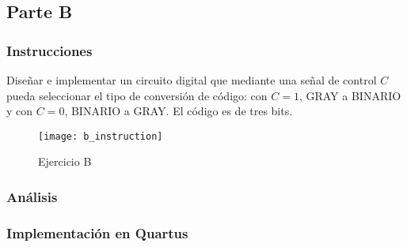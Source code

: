 \documentclass[../procedimientos.tex]{subfiles}
\begin{document}
\clearpage
\subsection{Parte B}
\subsubsection{Instrucciones}
Diseñar e implementar un circuito digital que mediante una señal de control 
$C$ pueda seleccionar el tipo de conversión de código: con $C=1$, GRAY a 
BINARIO y con $C=0$, BINARIO a GRAY. El código es de tres bits.
\begin{figure}[H]
  \centering
  \texttt{[image: b\_instruction]}
  \caption{Ejercicio B}
  \label{fig:b_inst}
\end{figure}

\subsubsection{Análisis}

\subsubsection{Implementación en Quartus}
\end{document}
